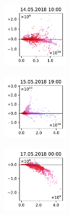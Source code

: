 \begin{figure}[H]
    \centering
    \begin{subfigure}
        \centering
        \includegraphics[width=0.30\textwidth,valign=t]{evaluation/figures/perturbations/perturbation-14.05.2018:10.00-anthropogenic-div-1.5.pdf}
    \end{subfigure}
    \begin{subfigure}
        \centering
        \includegraphics[width=0.30\textwidth,valign=t]{evaluation/figures/perturbations/perturbation-15.05.2018:19.00-anthropogenic-div-1.5.pdf}
    \end{subfigure}
    \begin{subfigure}
        \centering
        \includegraphics[width=0.30\textwidth,valign=t]{evaluation/figures/perturbations/perturbation-17.05.2018:00.00-anthropogenic-div-1.5.pdf}
    \end{subfigure}


\end{figure}
